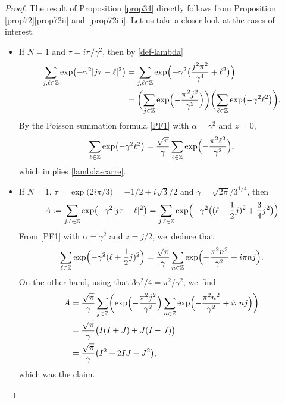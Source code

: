 \documentclass[JEP,XML,SOM,Unicode,NoFloatCountersInSection,published]{cedram}
\theoremstyle{definition}
\let\EE\exp
\newcommand\Z{\mathbb Z}
\begin{document}
\begin{proof}
The result of Proposition \ref{prop34} directly follows from Proposition \ref{prop72}\eqref{prop72ii} and~\eqref{prop72iii}. Let us take a closer look at the cases of interest.
\begin{itemize}
\item
If $N=1$ and $\tau={i \pi }/{\gamma^2}$, then by \eqref{def-lambda}
\begin{align*}
\sum_{j, \ell\in \Z}\EE\bigl({-\gamma^2 |j{\tau}-\ell|^{2}}\bigr)&= \sum_{j, \ell\in \Z}\EE\Bigl({-\gamma^2 \bigl(\frac{j^2 \pi^2}{\gamma^4}+ \ell^2\bigr)}\Bigr) \\
&= \biggl(\sum_{j\in\Z}\EE\Bigl(-\frac{\pi^2j^2}{\gamma^2} \Bigr)\biggr) \biggl(\sum_{\ell\in\Z}\EE\bigl(- \gamma^2 \ell^2\bigr)\biggr).
\end{align*}
By the Poisson summation formula \eqref{PF1} with $\alpha=\gamma^2$ and $z=0$,
\[
\sum_{\ell\in\Z}\EE\bigl(- \gamma^2 \ell^2\bigr)=\frac{\sqrt{\pi}}\gamma \sum_{\ell\in\Z}\EE\Bigl(-\frac{\pi^2\ell^2}{\gamma^2}\Bigr),
\]
which implies \eqref{lambda-carre}.

\item
If $N=1$, $\tau= \EE\bigl({2 i\pi/3}\bigr)=-1/2+ i \sqrt{3}/2$ and $\gamma={\sqrt{2\pi}}/{3^{1/4}}$, then
\[
A:= \sum_{j, \ell\in \Z}\EE\bigl(-\gamma^2 |j{\tau}-\ell|^{2}\bigr)= \sum_{j, \ell\in \Z}\EE\Bigl(-\gamma^2 \bigl((\ell+\frac12 j)^2+ \frac 34 j^2\bigr)\Bigr) 
\]
From \eqref{PF1} with $\alpha =\gamma^2$ and $z=j/2$, we~deduce that
\[
\sum_{ \ell\in \Z}\EE\Bigl(-\gamma^2 (\ell+\frac12 j)^2\Bigr) =\frac{\sqrt{\pi}}\gamma \sum_{ n\in \Z}\EE\Bigl(-\frac{\pi^2n^2}{\gamma^2}+i \pi n j\Bigr). 
\]
On the other hand, using that $3 \gamma^2/4= {\pi^2}/{\gamma^2}$, we~find
\begin{align*}
A &= \frac{\sqrt{\pi}}\gamma \sum_{j \in \Z}\biggl(\EE\Bigl(- \frac{\pi^2j^2}{\gamma^2 }\Bigr) \sum_{ n\in \Z}\EE\Bigl(-\frac{\pi^2n^2}{\gamma^2}+i \pi n j \Bigr)\biggr) \\
&= \frac{\sqrt{\pi}}\gamma \bigl(I(I+J)+J(I-J)\bigr) \\
&= \frac{\sqrt{\pi}}\gamma \bigl(I^2+2IJ-J^2\bigr),
\end{align*}
which was the claim.\qedhere
\end{itemize}
\end{proof}
\end{document}
